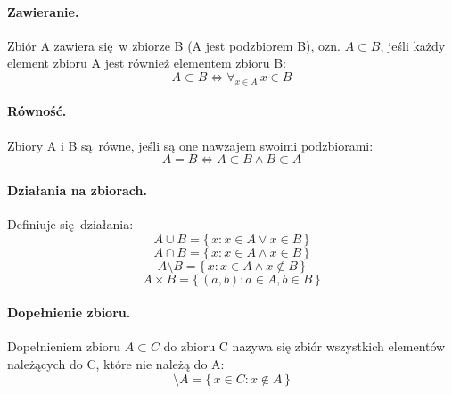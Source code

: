         \paragraph{Zawieranie.} Zbiór A zawiera się w zbiorze B (A jest podzbiorem B), ozn. $A \subset B$, jeśli każdy element zbioru A jest również elementem zbioru B:
        \begin{equation*}
            A \subset B \Leftrightarrow \forall_{x\in A} \,  x\in B
        \end{equation*}
        
        \paragraph{Równość.} Zbiory A i B są równe, jeśli są one nawzajem swoimi podzbiorami:
        \begin{equation*}
            A = B \Leftrightarrow A \subset B \wedge B \subset A
        \end{equation*}

        \paragraph{Działania na zbiorach.} Definiuje się działania:
        \begin{equation}
            \tag{Suma zbiorów}
            A \cup B = \{\,x: x \in A \vee x \in B\,\}
        \end{equation}
        \begin{equation*}
            \tag{Iloczyn zbiorów}
            A \cap B = \{\,x: x \in A \wedge x \in B\,\}
        \end{equation*}
        \begin{equation*}
            \tag{Różnica zbiorów}
            A \setminus B = \{\,x: x \in A \wedge x \notin B\,\}
        \end{equation*}
        \begin{equation*}
            \tag{Iloczyn kartezjański}
            A \times B = \{\,(a,b): a \in A, b \in B\,\}
        \end{equation*}
        
        \paragraph{Dopełnienie zbioru.}
        \begin{definition}
            Dopełnieniem zbioru $A \subset C$ do zbioru C nazywa się zbiór wszystkich elementów należących do C, które nie należą do A:
            \begin{equation*}
                \setminus A = \{\,x \in C: x \notin A\,\}
            \end{equation*}
        \end{definition}

